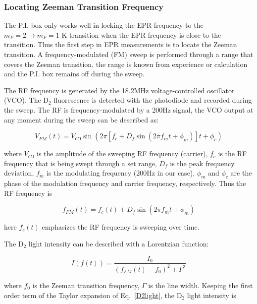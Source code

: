 \subsubsection{Locating Zeeman Transition Frequency}

The P.I. box only works well in locking the EPR frequency to the $m_{F}=2\rightarrow m_{F}=1$ K transition when the EPR frequency is close to the transition. Thus the first step in EPR measurements is to locate the Zeeman transition. A frequency-modulated (FM) sweep is performed through a range that covers the Zeeman transition, the range is known from experience or calculation and the P.I. box remains off during the sweep.

The RF frequency is generated by the 18.2MHz voltage-controlled oscillator (VCO). The D$_{2}$ fluorescence is detected with the photodiode and recorded during the sweep. The RF is frequency-modulated by a 200Hz signal, the VCO output at any moment during the sweep can be described as: 

\begin{equation}
V_{FM}(t)=V_{C0}\sin{\left(2\pi[f_{c}+D_{f}\sin{\left(2\pi f_{m}t+\phi_{m}\right)}]t+\phi_{c}\right)}
\end{equation}

where $V_{C0}$ is the amplitude of the sweeping RF frequency (carrier), $f_{c}$ is the RF frequency that is being swept through a set range, $D_{f}$ is the peak frequency deviation, $f_{m}$ is the modulating frequency (200Hz in our case), $\phi_{m}$ and $\phi_{c}$ are the phase of the modulation frequency and carrier frequency, respectively. Thus the RF frequency is

\begin{equation}
f_{FM}(t) = f_{c}(t)+D_{f}\sin{\left(2\pi f_{m}t+\phi_{m}\right)}
\end{equation}

here $f_{c}(t)$ emphasizes the RF frequency is sweeping over time. 

The D$_{2}$ light intensity can be described with a Lorentzian function:

\begin{equation}\label{D2light}
I(f(t))=\frac{I_{0}}{(f_{FM}(t)-f_{0})^{2}+\Gamma^{2}}
\end{equation}

where $f_{0}$ is the Zeeman transition frequency, $\Gamma$ is the line width. Keeping the first order term of the Taylor expansion of Eq.~\ref{D2light}, the D$_{2}$ light intensity is

